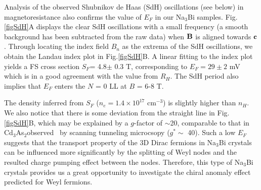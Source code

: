 Analysis of the observed Shubnikov de Haas (SdH) oscillations (see below) in magnetoresistance also confirms the value of $E_F$ in our Na$_3$Bi samples. Fig. \ref{figSdH}A displays the clear SdH oscillations with a small frequency (a smooth background has been subtracted from the raw data) when $\bf B$ is aligned towards $\bf c$ . Through locating the index field $B_n$ as the extrema of the SdH oscillations, we obtain the Landau index plot in Fig.\ref{figSdH}B. A linear fitting to the index plot yields a FS cross section $S_F$= 4.8$\pm$ 0.3 T, corresponding to $E_F = 29\pm 2$ mV which is in a good agreement with the value from $R_H$. The SdH period also implies that $E_F$ enters the $N$ = 0 LL at $B$ = 6-8 T. 





The density inferred from $S_F$ ($n_e = 1.4\times 10^{17}$ cm$^{-3}$) is slightly higher than $n_H$. We also notice that there is some deviation from the straight line in Fig. \ref{figSdH}B, which may be explained by a $g$-factor of $\sim$20, comparable to that in Cd$_3$As$_2$observed~\cite{Jeon2014} by scanning tunneling microcsopy ($g^*\sim$ 40). Such a low $E_F$ suggests that the transport property of the 3D Dirac fermions in Na$_3$Bi crystals can be influenced more significantly by the splitting of Weyl nodes and the resulted charge pumping effect between the nodes. Therefore, this type of Na$_3$Bi crystals provides us a great opportunity to investigate the chiral anomaly effect predicted for Weyl fermions.


